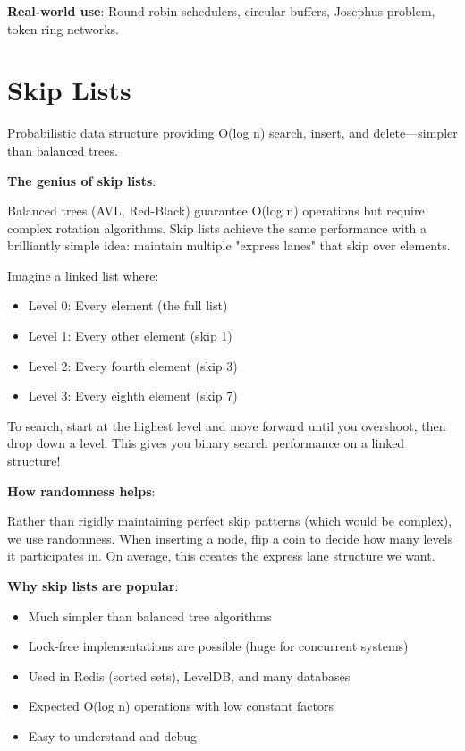 \textbf{Real-world use}: Round-robin schedulers, circular buffers, Josephus problem, token ring networks.

\section{Skip Lists}

Probabilistic data structure providing O(log n) search, insert, and delete—simpler than balanced trees.

\textbf{The genius of skip lists}:

Balanced trees (AVL, Red-Black) guarantee O(log n) operations but require complex rotation algorithms. Skip lists achieve the same performance with a brilliantly simple idea: maintain multiple "express lanes" that skip over elements.

Imagine a linked list where:
\begin{itemize}
    \item Level 0: Every element (the full list)
    \item Level 1: Every other element (skip 1)
    \item Level 2: Every fourth element (skip 3)
    \item Level 3: Every eighth element (skip 7)
\end{itemize}

To search, start at the highest level and move forward until you overshoot, then drop down a level. This gives you binary search performance on a linked structure!

\textbf{How randomness helps}:

Rather than rigidly maintaining perfect skip patterns (which would be complex), we use randomness. When inserting a node, flip a coin to decide how many levels it participates in. On average, this creates the express lane structure we want.

\textbf{Why skip lists are popular}:
\begin{itemize}
    \item Much simpler than balanced tree algorithms
    \item Lock-free implementations are possible (huge for concurrent systems)
    \item Used in Redis (sorted sets), LevelDB, and many databases
    \item Expected O(log n) operations with low constant factors
    \item Easy to understand and debug
\end{itemize}


